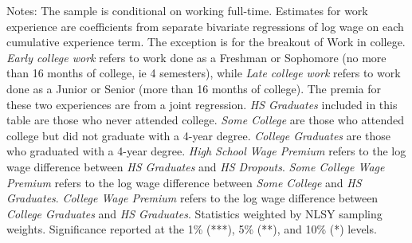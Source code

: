 \begin{table}[ht]
{\begin{threeparttable}
\footnotesize{Notes: The sample is conditional on working full-time. Estimates for work experience are coefficients from separate bivariate regressions of log wage on each cumulative experience term. The exception is for the breakout of Work in college. \emph{Early college work} refers to work done as a Freshman or Sophomore (no more than 16 months of college, ie 4 semesters), while \emph{Late college work} refers to work done as a Junior or Senior (more than 16 months of college). The premia for these two experiences are from a joint regression. \emph{HS Graduates} included in this table are those who never attended college. \emph{Some College} are those who attended college but did not graduate with a 4-year degree. \emph{College Graduates} are those who graduated with a 4-year degree. \emph{High School Wage Premium} refers to the log wage difference between \emph{HS Graduates} and \emph{HS Dropouts}. \emph{Some College Wage Premium} refers to the log wage difference between \emph{Some College} and \emph{HS Graduates}. \emph{College Wage Premium} refers to the log wage difference between \emph{College Graduates} and \emph{HS Graduates}. Statistics weighted by NLSY sampling weights. Significance reported at the 1\% (***), 5\% (**), and 10\% (*) levels.}
\end{threeparttable} 
} 
\end{table} 
